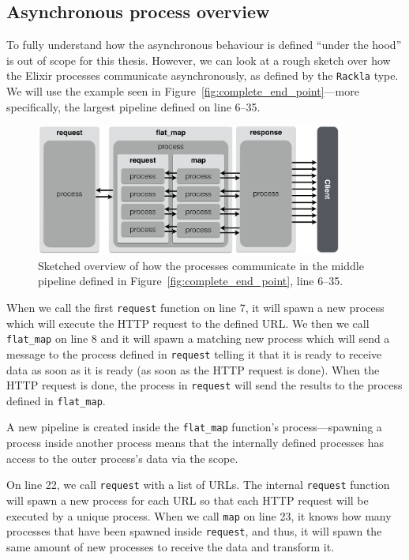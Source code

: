\documentclass{cslthse-msc}
\begin{document}
\subsection{Asynchronous process overview}
To fully understand how the asynchronous behaviour is defined \enquote{under the hood} is out of scope for this thesis. However, we can look at a rough sketch over how the Elixir processes communicate asynchronously, as defined by the \lstinline{Rackla} type. We will use the example seen in Figure~\ref{fig:complete_end_point}---more specifically, the largest pipeline defined on line 6--35.

\begin{figure}[H]
  \centering
    \begin{center}
      \includegraphics[width=0.9\textwidth]{images/process_overview.png}
    \end{center}
  \caption{Sketched overview of how the processes communicate in the middle pipeline defined in Figure~\ref{fig:complete_end_point}, line 6--35.}
  \label{fig:process}
\end{figure}

When we call the first \lstinline{request} function on line 7, it will spawn a new process which will execute the HTTP request to the defined URL. We then we call \lstinline{flat_map} on line 8 and it will spawn a matching new process which will send a message to the process defined in \lstinline{request} telling it that it is ready to receive data as soon as it is ready (as soon as the HTTP request is done). When the HTTP request is done, the process in \lstinline{request} will send the results to the process defined in \lstinline{flat_map}.

A new pipeline is created inside the \lstinline{flat_map} function's process---spawning a process inside another process means that the internally defined processes has access to the outer process's data via the scope. 

On line 22, we call \lstinline{request} with a list of URLs. The internal \lstinline{request} function will spawn a new process for each URL so that each HTTP request will be executed by a unique process. When we call \lstinline{map} on line 23, it knows how many processes that have been spawned inside \lstinline{request}, and thus, it will spawn the same amount of new processes to receive the data and transform it.
\end{document}
